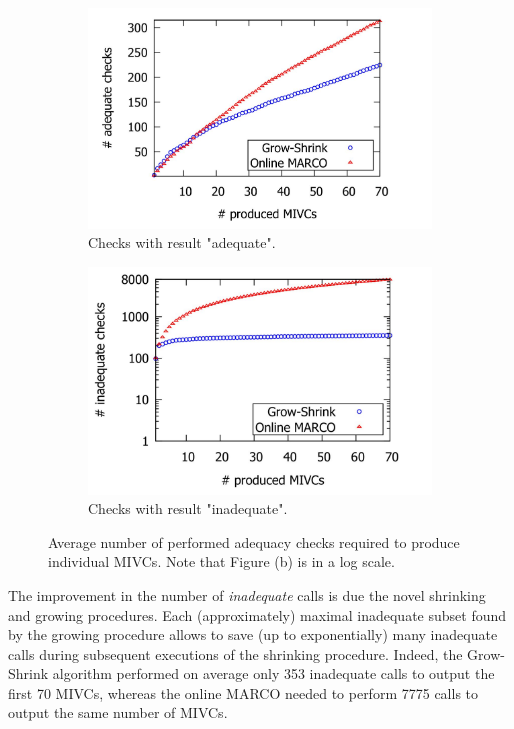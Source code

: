\begin{figure}
\centering
\begin{subfigure}{\textwidth}
  \centering
  \includegraphics[scale=0.5]{./figs/adequate_checks_per_mivc_70.png}
  \caption{Checks with result "adequate".}
  \label{res:adequate_checks} 
\end{subfigure}\hfill
\begin{subfigure}{\textwidth}
  \centering
  \includegraphics[scale=0.5]{./figs/inadequate_checks_per_mivc_70.png}
  \caption{Checks with result "inadequate".}
  \label{res:inadequate_checks}
\end{subfigure}
\caption{Average number of performed adequacy checks required to produce individual MIVCs. Note that Figure (b) is in a log scale.}
\label{res:checks}
\end{figure}

The improvement in the number of \emph{inadequate} calls is due the novel shrinking and growing procedures.
Each (approximately) maximal inadequate subset found by the growing procedure allows to save (up to exponentially) many inadequate calls during subsequent executions of the shrinking procedure.
Indeed, the Grow-Shrink algorithm performed on average only 353 inadequate calls to output the first 70 MIVCs, whereas the online MARCO needed to perform 7775 calls to output the same number of MIVCs.

